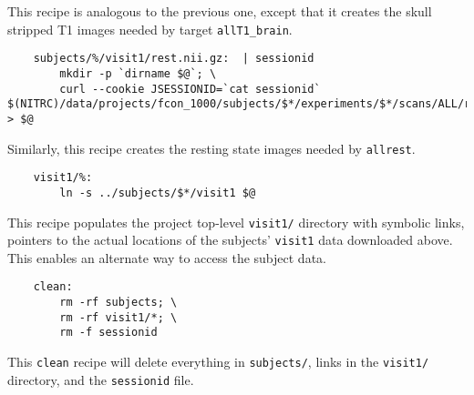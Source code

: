 \indent This recipe is analogous to the previous one, except
that it creates the skull stripped T1 images needed by target
\texttt{allT1_brain}.

\begin{lstlisting}
	subjects/%/visit1/rest.nii.gz:  | sessionid
		mkdir -p `dirname $@`; \
		curl --cookie JSESSIONID=`cat sessionid` $(NITRC)/data/projects/fcon_1000/subjects/$*/experiments/$*/scans/ALL/resources/NIfTI/files/scan_rest.nii.gz > $@
\end{lstlisting}

\indent Similarly, this recipe creates the resting state
images needed by \texttt{allrest}.


\begin{lstlisting}
	visit1/%:
		ln -s ../subjects/$*/visit1 $@
\end{lstlisting}

\indent  This recipe populates the project top-level \texttt{visit1/} directory with symbolic links, pointers to the actual locations of the subjects' \texttt{visit1} data downloaded above. This enables an alternate way to access the subject data.

\begin{lstlisting}
	clean:
		rm -rf subjects; \
		rm -rf visit1/*; \
		rm -f sessionid
\end{lstlisting}

This \texttt{clean} recipe will delete everything in
\texttt{subjects/}, links in the \texttt{visit1/} directory, and the
\texttt{sessionid} file.

